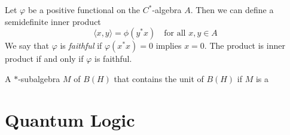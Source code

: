 Let \(\varphi\) be a positive functional on the \(C^\ast\)-algebra \(A\). Then we can define a semidefinite inner product
\[\langle x,y\rangle=\phi(y^\ast x) \quad \mbox{for all } x,y \in A\]
We say that \(\varphi\) is \emph{faithful} if \(\varphi(x^\ast x)=0\) implies \(x=0\). The product is inner product if and only if \(\varphi\) is faithful.


\begin{theorem}
    A \(\ast\)-subalgebra \(M\) of \(B(H)\) that contains the unit of \(B(H)\) if \(M\) is a
\end{theorem}

\section{Quantum Logic}


